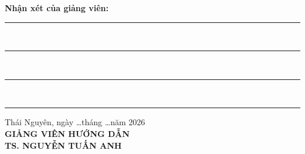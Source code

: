 \vspace{2mm}
\noindent\textbf{Nhận xét của giảng viên:}
\vspace{3mm}

\noindent\rule{\textwidth}{0.4pt}\\[4mm]
\noindent\rule{\textwidth}{0.4pt}\\[4mm]
\noindent\rule{\textwidth}{0.4pt}\\[4mm]
\noindent\rule{\textwidth}{0.4pt}

\vspace{1mm}
\begin{flushright}
  Thái Nguyên, ngày \ldots tháng \ldots năm 2026\\[3mm]
  \textbf{GIẢNG VIÊN HƯỚNG DẪN}\\[1mm]
\textbf{TS. NGUYỄN TUẤN ANH}
\end{flushright}
